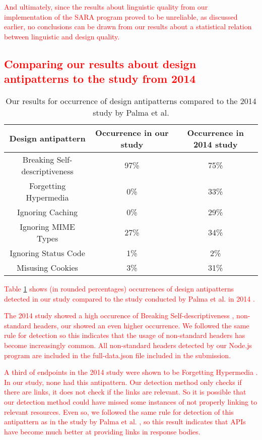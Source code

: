\textcolor{red}{
And ultimately, since the results about linguistic quality from our implementation of the SARA program proved to be unreliable, as discussed earlier, no conclusions can be drawn from our results about a statistical relation between linguistic and design quality. 
}

\textcolor{red}{
\subsection{Comparing our results about design antipatterns to the study from 2014}
}

\begin{table}[htb!]
    \centering
    \begin{tabular}{|c|c|c|} \hline
    Design antipattern & Occurrence in our study & Occurrence in 2014 study  \\ \hline
    Breaking Self-descriptiveness & 97\% & 75\%  \\ \hline
    Forgetting Hypermedia & 0\% & 33\%  \\ \hline
    Ignoring Caching & 0\% & 29\%   \\ \hline
    Ignoring MIME Types & 27\% & 34\%  \\ \hline
    Ignoring Status Code & 1\% & 2\%  \\ \hline
    Misusing Cookies & 3\% & 31\%  \\ \hline
    \end{tabular}
    \caption{Our results for occurrence of design antipatterns compared to the 2014 study by Palma et al. \cite{design}}
    \label{tab:design antipatterns compared to the 2014 study}
\end{table}

\textcolor{red}{
Table \ref{tab:design antipatterns compared to the 2014 study} shows (in rounded percentages) occurrences of design antipatterns detected in our study compared to the study conducted by Palma et al. in 2014 \cite{design}. 
}

\textcolor{red}{
The 2014 study showed a high occurence of Breaking Self-descriptiveness \cite{design}, non-standard headers, our showed an even higher occurrence. We followed the same rule for detection so this indicates that the usage of non-standard headers has become increasingly common. All non-standard headers detected by our Node.js program are included in the full-data.json file included in the submission. 
}

\textcolor{red}{
A third of endpoints in the 2014 study were shown to be Forgetting Hypermedia \cite{design}. In our study, none had this antipattern. Our detection method only checks if there are links, it does not check if the links are relevant. So it is possible that our detection method could have missed some instances of not properly linking to relevant resources. Even so, we followed the same rule for detection of this antipattern as in the study by Palma et al. \cite{design}, so this result indicates that APIs have become much better at providing links in response bodies.
}

